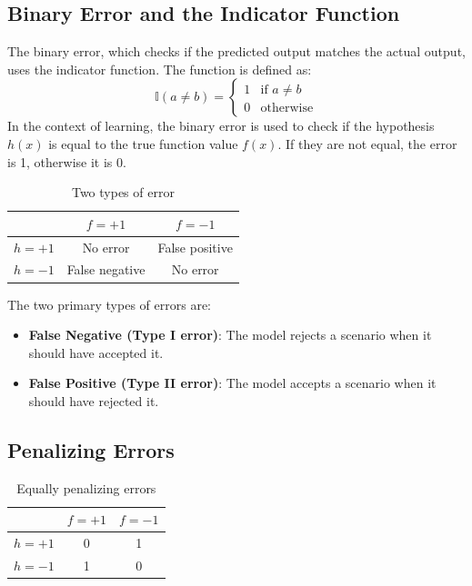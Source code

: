 \subsection{Binary Error and the Indicator Function}\label{indicatorfunc}
The binary error, which checks if the predicted output matches the actual output, uses the indicator function. The function is defined as:
\[
\mathbb{I}(a \neq b) = 
\begin{cases} 
1 & \text{if } a \neq b \\
0 & \text{otherwise}
\end{cases}
\]
In the context of learning, the binary error is used to check if the hypothesis $h(x)$ is equal to the true function value $f(x)$. If they are not equal, the error is 1, otherwise it is 0.

\begin{table}[H]
\centering
\begin{tabular}{|c|c|c|}
\hline
& $f = +1$ & $f = -1$ \\
\hline
$h = +1$ & No error & False positive \\
\hline
$h = -1$ & False negative & No error \\
\hline
\end{tabular}
\caption{Two types of error}
\end{table}

The two primary types of errors are:
\begin{itemize}
    \item \textbf{False Negative (Type I error)}: The model rejects a scenario when it should have accepted it.
    \item \textbf{False Positive (Type II error)}: The model accepts a scenario when it should have rejected it.
\end{itemize}

\subsection{Penalizing Errors}

\begin{table}[H]
\centering
\begin{tabular}{|c|c|c|}
\hline
& $f = +1$ & $f = -1$ \\
\hline
$h = +1$ & 0 & 1 \\
\hline
$h = -1$ & 1 & 0 \\
\hline
\end{tabular}
\caption{Equally penalizing errors}
\end{table}


